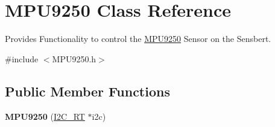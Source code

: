 \hypertarget{class_m_p_u9250}{}\section{M\+P\+U9250 Class Reference}
\label{class_m_p_u9250}


Provides Functionality to control the \hyperlink{class_m_p_u9250}{M\+P\+U9250} Sensor on the Sensbert.  




{\ttfamily \#include $<$M\+P\+U9250.\+h$>$}

\subsection*{Public Member Functions}
\begin{DoxyCompactItemize}
\item 
\hypertarget{class_m_p_u9250_aec4e224a28dd0e29204362845180c4fd}{}{\bfseries M\+P\+U9250} (\hyperlink{class_i2_c___r_t}{I2\+C\+\_\+\+R\+T} $\ast$i2c)\label{class_m_p_u9250_aec4e224a28dd0e29204362845180c4fd}


\end{DoxyCompactItemize}
